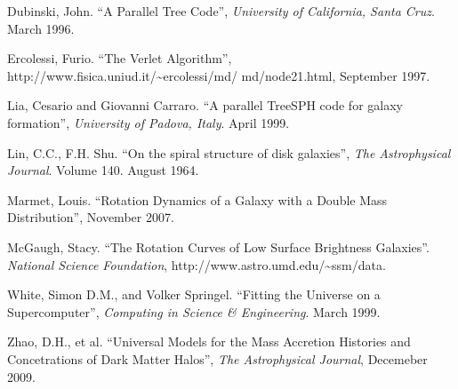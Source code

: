 \documentclass{article}
\begin{document}
\begin{thebibliography}{99}

	Dubinski, John.
	``A Parallel Tree Code'',
	\emph{University of California, Santa Cruz}.
	March 1996.
	
	Ercolessi, Furio.
	``The Verlet Algorithm'',
	http://www.fisica.uniud.it/\textasciitilde ercolessi/md/\- md/node21.html,
	September 1997.
	
	Lia, Cesario and Giovanni Carraro.
	``A parallel TreeSPH code for galaxy formation'',
	\emph{University of Padova, Italy}.
	April 1999.
	
	Lin, C.C., F.H. Shu.
	``On the spiral structure of disk galaxies'',
	\emph{The Astrophysical Journal}.
	Volume 140.
	August 1964.
  
  Marmet, Louis.
  ``Rotation Dynamics of a Galaxy with a Double Mass Distribution'',
  November 2007.
  
	McGaugh, Stacy.
	``The Rotation Curves of Low Surface Brightness Galaxies''.
	\emph{National Science Foundation},
	http://www.astro.umd.edu/\textasciitilde ssm/data.
  
  White, Simon D.M., and Volker Springel.
  ``Fitting the Universe on a Supercomputer'',
  \emph{Computing in Science \& Engineering}.
  March 1999.
  
	Zhao, D.H., et al.
	``Universal Models for the Mass Accretion Histories and Concetrations of Dark Matter Halos'',
	\emph{The Astrophysical Journal},
	Decemeber 2009.
	  

\end{thebibliography}
\end{document}
